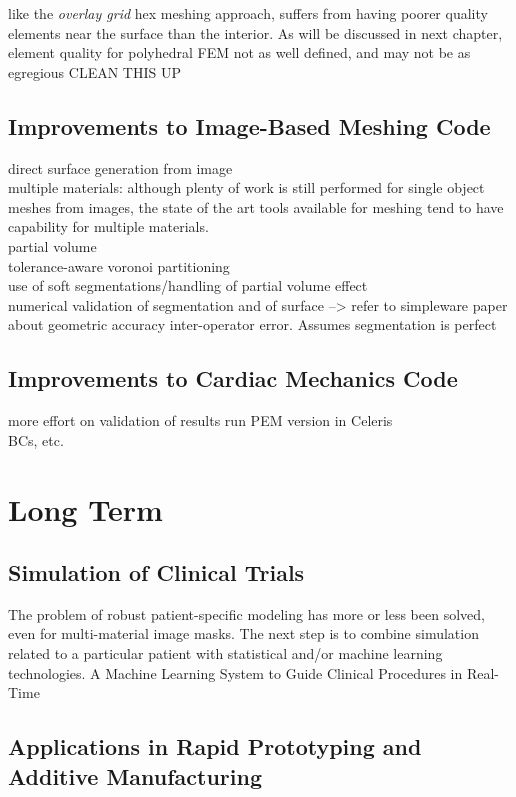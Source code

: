 like the \textit{overlay grid} hex meshing approach, suffers from having poorer quality elements near the surface than the interior. As will be discussed in next chapter, element quality for polyhedral FEM not as well defined, and may not be as egregious
CLEAN THIS UP


\subsection{Improvements to Image-Based Meshing Code}
\label{Improvements to Image-Based Meshing Code}
direct surface generation from image \\
multiple materials: although plenty of work is still performed for single object meshes from images, the state of the art tools available for meshing tend to have capability for multiple materials.  \\
partial volume \\
tolerance-aware voronoi partitioning \\
use of soft segmentations/handling of partial volume effect  \\
numerical validation of segmentation and of surface --> refer to simpleware paper about geometric accuracy
inter-operator error. Assumes segmentation is perfect

\subsection{Improvements to Cardiac Mechanics Code}
\label{Improvements to Cardiac Mechanics Code}
more effort on validation of results
run PEM version in Celeris \\
BCs, etc.

\section{Long Term}
\label{Long Term}

\subsection{Simulation of Clinical Trials}
\label{Simulation of Clinical Trials}
The problem of robust patient-specific modeling has more or less been solved, even for multi-material image masks. The next step is to combine simulation related to a particular patient with statistical and/or machine learning technologies. 
A Machine Learning System to Guide Clinical Procedures in Real-Time

\subsection[Applications in Rapid Prototyping and Additive Manufacturing]{\texorpdfstring{Applications in Rapid Prototyping and Additive \newline Manufacturing}{Applications in Rapid Prototyping and Additive \newline Manufacturing}}
\label{Applications in Rapid Prototyping and Additive Manufacturing}


